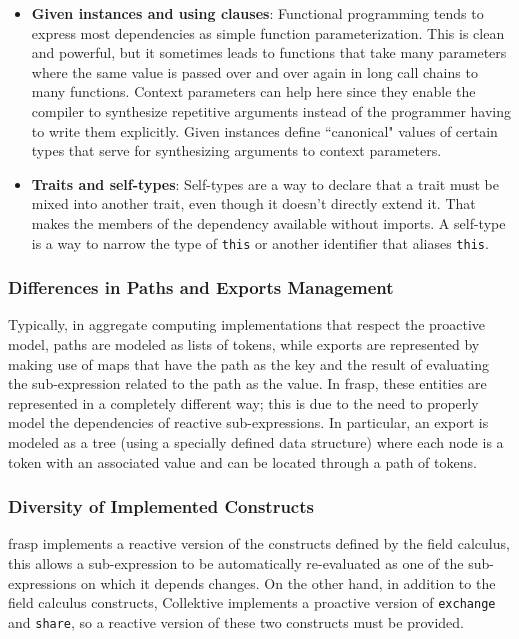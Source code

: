 \begin{itemize}
    \item \textbf{Given instances and using clauses}: Functional programming tends to express most dependencies as simple function parameterization. This is clean and powerful, but it sometimes leads to functions that take many parameters where the same value is passed over and over again in long call chains to many functions. Context parameters can help here since they enable the compiler to synthesize repetitive arguments instead of the programmer having to write them explicitly. Given instances define ``canonical" values of certain types that serve for synthesizing arguments to context parameters.
    \item \textbf{Traits and self-types}: Self-types are a way to declare that a trait must be mixed into another trait, even though it doesn't directly extend it. That makes the members of the dependency available without imports. A self-type is a way to narrow the type of \texttt{this} or another identifier that aliases \texttt{this}.
\end{itemize}

\subsubsection{Differences in Paths and Exports Management}

Typically, in aggregate computing implementations that respect the proactive model, paths are modeled as lists of tokens, while exports are represented by making use of maps that have the path as the key and the result of evaluating the sub-expression related to the path as the value.
In \ac{frasp}, these entities are represented in a completely different way; this is due to the need to properly model the dependencies of reactive sub-expressions. In particular, an export is modeled as a tree (using a specially defined data structure) where each node is a token with an associated value and can be located through a path of tokens.

\subsubsection{Diversity of Implemented Constructs}

\ac{frasp} implements a reactive version of the constructs defined by the field calculus, this allows a sub-expression to be automatically re-evaluated as one of the sub-expressions on which it depends changes. On the other hand, in addition to the field calculus constructs, Collektive implements a proactive version of \texttt{exchange} and \texttt{share}, so a reactive version of these two constructs must be provided.

